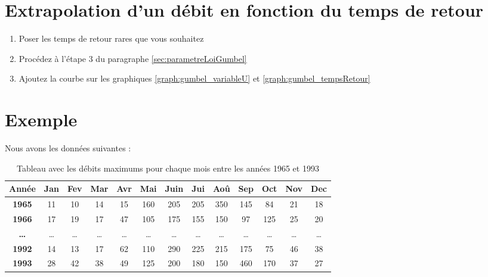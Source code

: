 \section{Extrapolation d'un débit en fonction du temps de retour}
\begin{enumerate}
    \item Poser les temps de retour rares que vous souhaitez
    \item Procédez à l'étape 3 du paragraphe \ref{sec:parametreLoiGumbel}
    \item Ajoutez la courbe sur les graphiques \ref{graph:gumbel_variableU} et \ref{graph:gumbel_tempsRetour}
\end{enumerate}

\section{Exemple}
Nous avons les données suivantes :
\begin{table}[H]
    \centering
    \begin{tabular}{|c||c|c|c|c|c|c|c|c|c|c|c|c|}
        \hline
        \textbf{Année} & \textbf{Jan} & \textbf{Fev} & \textbf{Mar} & \textbf{Avr} & \textbf{Mai} & \textbf{Juin} & \textbf{Jui} & \textbf{Aoû} & \textbf{Sep} & \textbf{Oct} & \textbf{Nov} & \textbf{Dec} \\
        \hline \hline
        \textbf{1965}  & 11 & \cellcolor{green}10 & 14 & 15 & 160 & 205 & 205 & \cellcolor{red}350 & 145 &  84 &  21 & 18 \\
        \hline
        \textbf{1966}  & \cellcolor{green}17 & 19 & 17 & 47 & 105 & \cellcolor{red}175 & 155 & 150 &  97 & 125 &  25 & 20 \\
        \hline
        \textbf{\dots} & \dots & \dots & \dots & \dots & \dots & \dots & \dots & \dots & \dots & \dots & \dots & \dots \\
        \hline
        \textbf{1992}  & 14 & \cellcolor{green}13 & 17 & 62 & 110 & \cellcolor{red}290 & 225 & 215 & 175 &  75 &  46 & 38 \\
        \hline
        \textbf{1993}  & 28 & 42 & 38 & 49 & 125 & 200 & 180 & 150 & \cellcolor{red}460 & 170 &  37 & \cellcolor{green}27 \\
        \hline
    \end{tabular}
    \caption{Tableau avec les débits maximums pour chaque mois entre les années 1965 et 1993}
    \label{tab:seriesAnnuellesMaximum}
\end{table}

